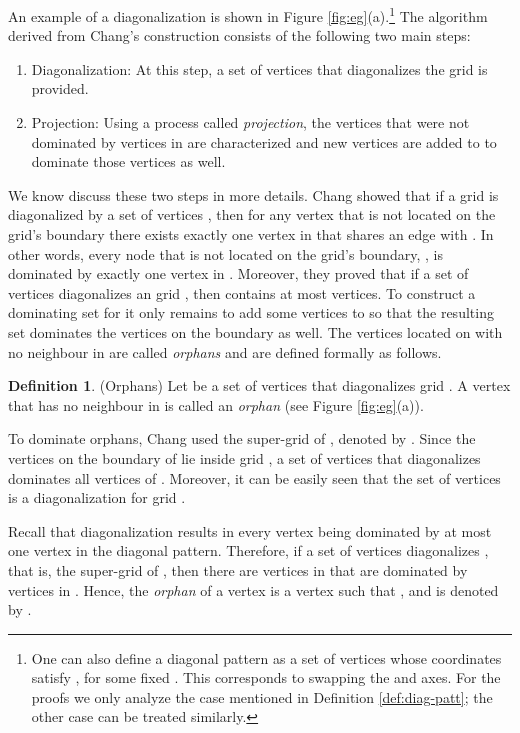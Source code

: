 \documentclass[letterpaper, 10pt, conference]{ieeeconf}
\theoremstyle{definition}
\newtheorem{definition}[theorem]{Definition}
\theoremstyle{remark}
\begin{document}
An example of a diagonalization is shown in Figure \ref{fig:eg}(a).\footnote{One can also define a diagonal pattern as a set of vertices whose  coordinates satisfy , for some fixed . This corresponds to swapping the  and  axes. For the proofs we only analyze the case mentioned in Definition \ref{def:diag-patt}; the other case can be treated similarly.} 
The algorithm derived from Chang's construction consists of the following two main steps:
\begin{enumerate}
  \item Diagonalization: At this step, a set of vertices  that diagonalizes the grid is provided. 
  \item Projection: Using a process called \emph{projection}, the vertices that were not dominated by vertices in  are characterized and new vertices are added to  to dominate those vertices as well.
\end{enumerate}

We know discuss these two steps in more details. Chang  showed that if a grid  is diagonalized by a set of vertices , then for any vertex  that is not located on the grid's boundary there exists exactly one vertex in  that shares an edge with . In other words, every node that is not located on the grid's boundary, , is dominated by exactly one vertex in . Moreover, they proved that if a set of vertices  diagonalizes an  grid , then  contains at most  vertices. To construct a dominating set for  it only remains to add some vertices to  so that the resulting set dominates the vertices on the boundary as well. The vertices located on  with no neighbour in  are called \emph{orphans} and are defined formally as follows.

\begin{definition}(Orphans)
\label{def:orphan}
Let  be a set of vertices that diagonalizes grid . A vertex  that has no neighbour in  is called an \emph{orphan} (see Figure \ref{fig:eg}(a)).
\end{definition}

To dominate orphans, Chang  used the super-grid of , denoted by . Since the vertices on the boundary of  lie inside grid , a set of vertices  that diagonalizes  dominates all vertices of . Moreover, it can be easily seen that the set of vertices  is a diagonalization for grid .

Recall that diagonalization results in every vertex being dominated by at most one vertex in the diagonal pattern. Therefore, if a set of vertices  diagonalizes , that is, the super-grid of , then there are vertices in  that are dominated by vertices in . Hence, the \emph{orphan} of a vertex  is a vertex  such that , and is denoted by .
\end{document}
